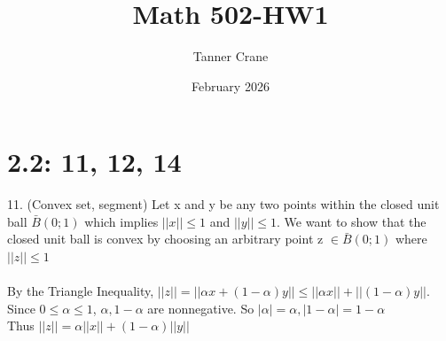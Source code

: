 \documentclass{article}
\title{Math 502-HW1}
\author{Tanner Crane}
\date{February 2026}
\begin{document}
\maketitle

\section{2.2: 11, 12, 14}
11. (Convex set, segment) 
Let x and y be any two points within the closed unit ball $\bar{B}(0;1)$ which implies $||x|| \leq 1$ and $ ||y|| \leq 1$.
We want to show that the closed unit ball is convex by choosing an arbitrary point z $\in \bar{B}(0;1)$ where $||z|| \leq 1$
\\\\
By the Triangle Inequality, $||z|| = ||\alpha x + (1-\alpha)y|| \leq ||\alpha x|| + ||(1-\alpha)y|| $. Since $0 \leq \alpha \leq 1$, $\alpha, 1-\alpha$ are nonnegative. So $|\alpha| = \alpha, |1-\alpha| = 1-\alpha$\\ Thus
$||z|| = \alpha||x|| + (1-\alpha)||y||$ \\
\end{document}
